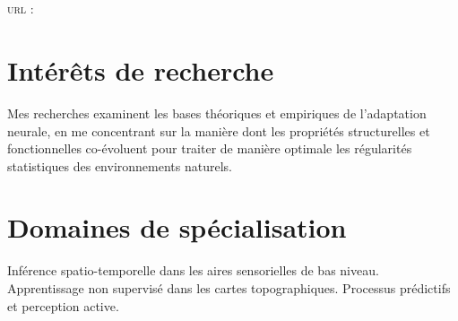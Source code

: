 \documentclass[11pt, a4paper, french]{article}
\newcommand{\years}[1]{\marginnote{\scriptsize #1}}
\begin{document}
\pagestyle{empty}
\reversemarginpar
\textsf{\Large \Author}\\[1cm]
\Address \\[.2cm]
\textsc{url} : \href{\Website}{\Website}\\
\section*{Intérêts de recherche}
Mes recherches examinent les bases théoriques et empiriques de l'adaptation neurale, en me concentrant sur la manière dont les propriétés structurelles et fonctionnelles co-évoluent pour traiter de manière optimale les régularités statistiques des environnements naturels.
\section*{Domaines de spécialisation}
Inférence spatio-temporelle dans les aires sensorielles de bas niveau. %
Apprentissage non supervisé dans les cartes topographiques. %
Processus prédictifs et perception active.
%
%
\end{document}
